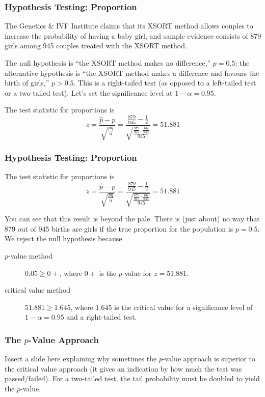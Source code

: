 \documentclass[xcolor=dvipsnames]{beamer}
\begin{document}
\begin{frame}
  \frametitle{Hypothesis Testing: Proportion}
   The Genetics \& IVF Institute claims
  that its XSORT method allows couples to increase the probability of
  having a baby girl, and sample evidence consists of 879 girls among
  945 couples treated with the XSORT method.

  The null hypothesis is ``the XSORT method makes no difference,''
  $p=0.5$; the alternative hypothesis is ``the XSORT method makes a
  difference and favours the birth of girls,'' $p>0.5$. This is a
  \alert{right-tailed test} (as opposed to a \alert{left-tailed test}
  or a \alert{two-tailed test}). Let's set the significance level at
  $1-\alpha=0.95$.

The test statistic for proportions is 
\begin{equation}
  \label{eq:bahhixie}
  z=\frac{\hat{p}-p}{\sqrt{\frac{pq}{n}}}=\frac{\frac{879}{945}-\frac{1}{2}}{\sqrt{\frac{\frac{879}{945}\cdot\frac{66}{945}}{945}}}=51.881
\end{equation}
\end{frame}

\begin{frame}
  \frametitle{Hypothesis Testing: Proportion}
The test statistic for proportions is 
\begin{equation}
  \label{eq:aegaasee}
  z=\frac{\hat{p}-p}{\sqrt{\frac{pq}{n}}}=\frac{\frac{879}{945}-\frac{1}{2}}{\sqrt{\frac{\frac{879}{945}\cdot\frac{66}{945}}{945}}}=51.881
\end{equation}

You can see that this result is beyond the pale. There is (just about)
no way that 879 out of 945 births are girls if the true proportion for
the population is $p=0.5$. We reject the null hypothesis because
\begin{description}
\item[$p$-value method] $0.05\geq{}0+$, where $0+$ is the $p$-value for
  $z=51.881$.
\item[critical value method] $51.881\geq{}1.645$, where $1.645$ is the
  critical value for a significance level of $1-\alpha=0.95$ and a
  right-tailed test.
\end{description}
\end{frame}

\begin{frame}
  \frametitle{The $p$-Value Approach}
  Insert a slide here explaining why sometimes the $p$-value approach
  is superior to the critical value approach (it gives an indication
  by how much the test was passed/failed). For a two-tailed test, the
  tail probability must be doubled to yield the $p$-value.
\end{frame}
\end{document}
